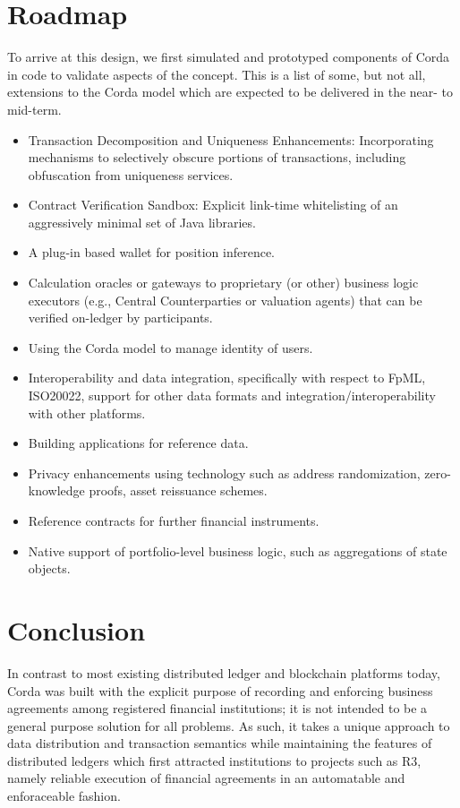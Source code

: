 \documentclass{article}
\begin{document}
\section{Roadmap}
To arrive at this design, we first simulated and prototyped components of Corda in code to validate aspects of the concept. This is a list of some, but not all, extensions to the Corda model which are expected to be delivered in the near- to mid-term.
\begin{itemize}	
\item Transaction Decomposition and Uniqueness Enhancements: Incorporating mechanisms to selectively obscure portions of transactions, including obfuscation from uniqueness services.
\item Contract Verification Sandbox: Explicit link-time whitelisting of an aggressively minimal set of Java libraries.
\item A plug-in based wallet for position inference.
\item Calculation oracles or gateways to proprietary (or other) business logic executors (e.g., Central Counterparties or valuation agents) that can be verified on-ledger by participants.
\item	Using the Corda model to manage identity of users.
\item Interoperability and data integration, specifically with respect to FpML, ISO20022, support for other data formats and integration/interoperability with other platforms.
\item	Building applications for reference data.
\item	Privacy enhancements using technology such as address randomization, zero-knowledge proofs, asset reissuance schemes.
\item	Reference contracts for further financial instruments.
\item Native support of portfolio-level  business logic, such as aggregations of state objects.
\end{itemize}
\section{Conclusion}
In contrast to most existing distributed ledger and blockchain platforms today, Corda was built with the explicit purpose of recording and enforcing business agreements among registered financial institutions; it is not intended to be a general purpose solution for all problems. As such, it takes a unique approach to data distribution and transaction semantics while maintaining the features of distributed ledgers which first attracted institutions to projects such as R3, namely reliable execution of financial agreements in an automatable and enforaceable fashion.


\end{document}
